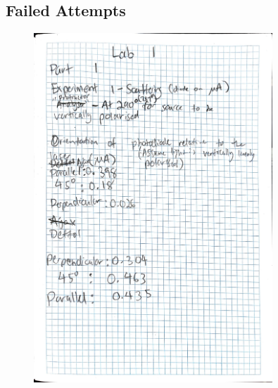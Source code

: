 \documentclass{article}
\begin{document}
\subsection{Failed Attempts}
\begin{figure}[H]
    \centering
    \includegraphics[width=0.8\textwidth]{labbook1.jpg}
\end{figure}
\end{document}

